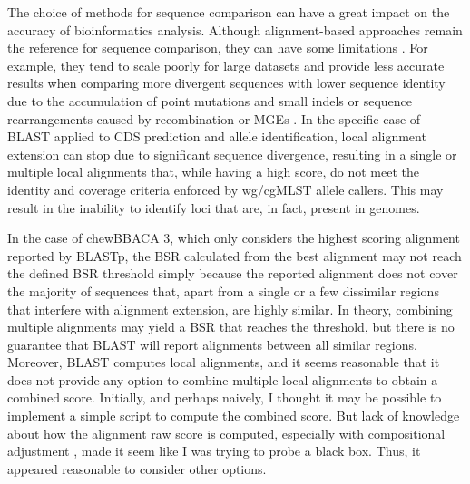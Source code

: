 The choice of methods for sequence comparison can have a great impact on the accuracy of bioinformatics analysis. Although alignment-based approaches remain the reference for sequence comparison, they can have some limitations \cite{zielezinski_alignment-free_2017}. For example, they tend to scale poorly for large datasets and provide less accurate results when comparing more divergent sequences with lower sequence identity due to the accumulation of point mutations and small indels or sequence rearrangements caused by recombination or \ac{MGEs} \cite{zielezinski_benchmarking_2019}. In the specific case of \ac{BLAST} \cite{altschul_basic_1990, camacho_blast_2009} applied to \ac{CDS} prediction and allele identification, local alignment extension can stop due to significant sequence divergence, resulting in a single or multiple local alignments that, while having a high score, do not meet the identity and coverage criteria enforced by \ac{wg/cgMLST} allele callers. This may result in the inability to identify loci that are, in fact, present in genomes.

In the case of chewBBACA 3, which only considers the highest scoring alignment reported by \ac{BLASTp}, the \ac{BSR} calculated from the best alignment may not reach the defined \ac{BSR} threshold simply because the reported alignment does not cover the majority of sequences that, apart from a single or a few dissimilar regions that interfere with alignment extension, are highly similar. In theory, combining multiple alignments may yield a \ac{BSR} that reaches the threshold, but there is no guarantee that \ac{BLAST} will report alignments between all similar regions. Moreover, \ac{BLAST} computes local alignments, and it seems reasonable that it does not provide any option to combine multiple local alignments to obtain a combined score. Initially, and perhaps naively, I thought it may be possible to implement a simple script to compute the combined score. But lack of knowledge about how the alignment raw score is computed, especially with compositional adjustment \cite{schaffer_improving_2001, yu_construction_2005}, made it seem like I was trying to probe a black box. Thus, it appeared reasonable to consider other options.

